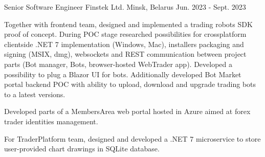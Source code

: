 

\begin{cventries}

  \cventry
    {Senior Software Engineer} %
    {Finstek Ltd.} %
    {Minsk, Belarus} %
    {Jun. 2023 - Sept. 2023} %
    {
      \begin{cvitems} %
        \item {Together with frontend team, designed and implemented a trading robots SDK proof of concept. During POC stage researched possibilities for crossplatform clientside .NET 7 implementation (Windows, Mac), installers packaging and signing (MSIX, dmg), websockets and REST communication between project parts (Bot manager, Bots, browser-hosted WebTrader app). Developed a possibility to plug a Blazor UI for bots. Additionally developed Bot Market portal backend POC with ability to upload, download and upgrade trading bots to a latest versions.}
        \item {Developed parts of a MembersArea web portal hosted in Azure aimed at forex trader identities management.}
        \item {For TraderPlatform team, designed and developed a .NET 7 microservice to store user-provided chart drawings in SQLite database.}
      \end{cvitems}
    }


\end{cventries}
